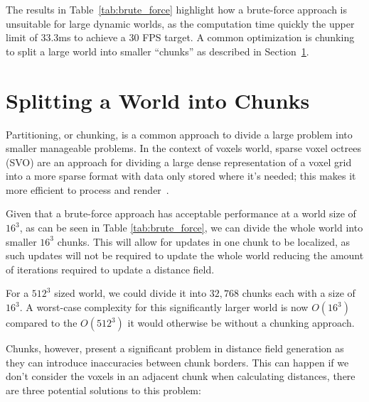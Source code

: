 The results in Table~\ref{tab:brute_force} highlight how a brute-force approach is unsuitable for large dynamic worlds,
as the computation time quickly the upper limit of 33.3ms to achieve a 30 FPS target. A common optimization is chunking
to split a large world into smaller ``chunks'' as described in Section~\ref{sec:chunking}.

\section{Splitting a World into Chunks} \label{sec:chunking}
Partitioning, or chunking, is a common approach to divide a large problem into smaller manageable problems. In the
context of voxels world, sparse voxel octrees (SVO) are an approach for dividing a large dense representation of a voxel
grid into a more sparse format with data only stored where it's needed; this makes it more efficient to process and
render~\cite{laine2010efficient,mileff2019simplified,van2015real}.

Given that a brute-force approach has acceptable performance at a world size of \(16^3\), as can be seen in Table
\ref{tab:brute_force}, we can divide the whole world into smaller \(16^3\) chunks. This will allow for updates in one
chunk to be localized, as such updates will not be required to update the whole world reducing the amount of iterations
required to update a distance field.

For a \(512^3\) sized world, we could divide it into \(32,768\) chunks each with a size of \(16^3\). A worst-case
complexity for this significantly larger world is now \(O(16^3)\) compared to the \(O(512^3)\) it would otherwise be
without a chunking approach.

Chunks, however, present a significant problem in distance field generation as they can introduce inaccuracies between
chunk borders. This can happen if we don't consider the voxels in an adjacent chunk when calculating distances, there
are three potential solutions to this problem:

